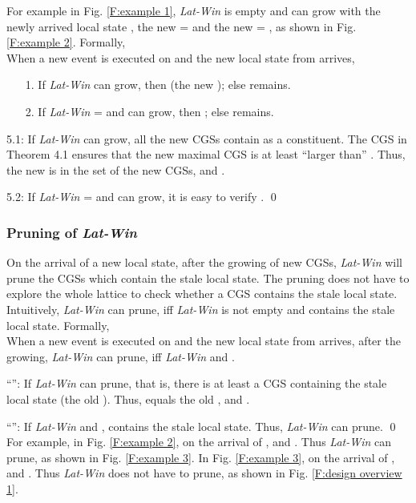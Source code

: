 \documentclass[12pt,journal,letterpaper,compsoc]{IEEEtran}
\begin{document}
For example in Fig. \ref{F:example 1}, {\it Lat-Win} is empty and can grow with the newly arrived local state , the new  =  and the new  = , as shown in Fig. \ref{F:example 2}. Formally, \\

 When a new event  is executed on  and the new local state  from  arrives,
\begin{itemize}
    \item[1.] If {\it Lat-Win} can grow, then  (the new ); else  remains.
    \item[2.] If {\it Lat-Win} =  and can grow, then ; else  remains.
\end{itemize}


5.1: If {\it Lat-Win} can grow, all the new CGSs contain  as a constituent. The CGS  in Theorem 4.1 ensures that the new maximal CGS is at least ``larger than'' . Thus, the new  is in the set of the new CGSs, and .

5.2: If {\it Lat-Win} =  and can grow, it is easy to verify . \qed \\

\subsubsection{Pruning of {\it Lat-Win}}

On the arrival of a new local state, after the growing of new CGSs, {\it Lat-Win} will prune the CGSs which contain the stale local state. The pruning does not have to explore the whole lattice to check whether a CGS contains the stale local state. Intuitively, {\it Lat-Win} can prune, iff {\it Lat-Win} is not empty and  contains the stale local state. Formally, \\

 When a new event  is executed on  and the new local state  from  arrives, after the growing, {\it Lat-Win} can prune, iff {\it Lat-Win}  and .


``'': If {\it Lat-Win} can prune, that is, there is at least a CGS containing the stale local state (the old ). Thus,  equals the old , and .

``'': If {\it Lat-Win}  and ,  contains the stale local state. Thus, {\it Lat-Win} can prune. \qed \\

For example, in Fig. \ref{F:example 2}, on the arrival of ,  and . Thus {\it Lat-Win} can prune, as shown in Fig. \ref{F:example 3}. In Fig. \ref{F:example 3}, on the arrival of ,  and . Thus {\it Lat-Win} does not have to prune, as shown in Fig. \ref{F:design overview 1}.
\end{document}
